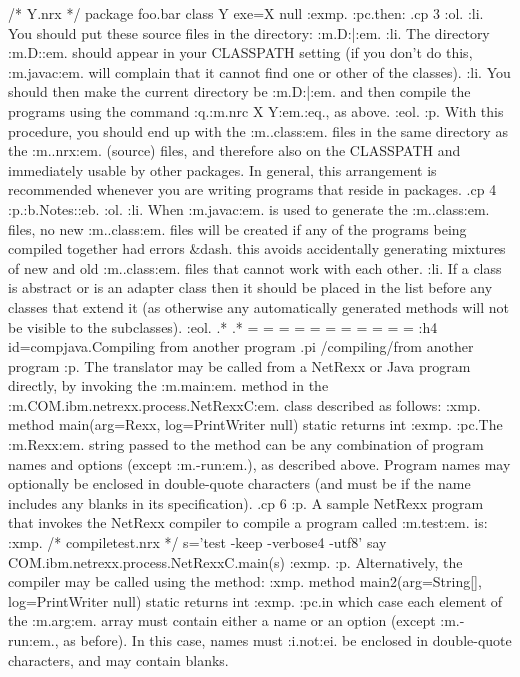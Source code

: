 /* Y.nrx */
package foo.bar
class Y
  exe=X null
:exmp.
:pc.then:
.cp 3
:ol.
:li.
You should put these source files in the directory: :m.D:\myproject\foo\bar:em.
:li.
The directory :m.D:\myproject:em. should appear in your CLASSPATH
setting (if you don't do this, :m.javac:em. will complain that it cannot
find one or other of the classes).
:li.
You should then make the current directory be :m.D:\myproject\foo\bar:em.
and then compile the programs using the command :q.:m.nrc X Y:em.:eq.,
as above.
:eol.
:p.
With this procedure, you should end up with the :m..class:em. files in
the same directory as the :m..nrx:em. (source) files, and therefore also
on the CLASSPATH and immediately usable by other packages.  In general,
this arrangement is recommended whenever you are writing programs that
reside in packages.
.cp 4
:p.:b.Notes::eb.
:ol.
:li.
When :m.javac:em. is used to generate the :m..class:em. files, no
new :m..class:em. files will be created if any of the programs being
compiled together had errors &dash. this avoids accidentally generating
mixtures of new and old :m..class:em. files that cannot work with each
other.
:li.
If a class is abstract or is an adapter class then it should be placed
in the list before any classes that extend it (as otherwise any
automatically generated methods will not be visible to the subclasses).
:eol.
.*
.* = = = = = = = = = = =
:h4 id=compjava.Compiling from another program
.pi /compiling/from another program
:p.
The translator may be called from a NetRexx or Java program directly, by
invoking the :m.main:em. method in the :m.COM.ibm.netrexx.process.NetRexxC:em.
class described as follows:
:xmp.
method main(arg=Rexx, log=PrintWriter null) static returns int
:exmp.
:pc.The :m.Rexx:em. string passed to the method can be any combination of
program names and options (except :m.-run:em.), as described above.
Program names may optionally be enclosed in double-quote characters (and
must be if the name includes any blanks in its specification).
.cp 6
:p.
A sample NetRexx program that invokes the NetRexx compiler to compile a
program called :m.test:em. is:
:xmp.
/* compiletest.nrx */
s='test -keep -verbose4 -utf8'
say COM.ibm.netrexx.process.NetRexxC.main(s)
:exmp.
:p.
Alternatively, the compiler may be called using the method:
:xmp.
method main2(arg=String[], log=PrintWriter null) static returns int
:exmp.
:pc.in which case each element of the :m.arg:em. array must contain
either a name or an option (except :m.-run:em., as before).  In this
case, names must :i.not:ei. be enclosed in double-quote characters, and
may contain blanks.
